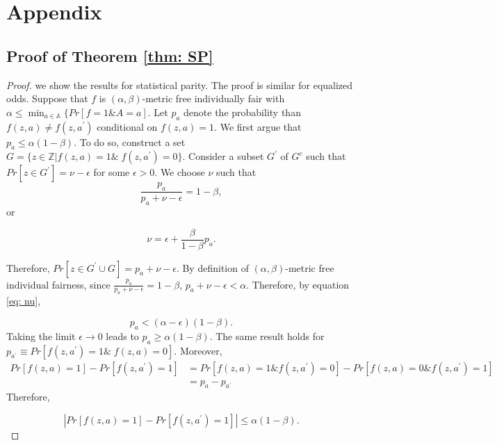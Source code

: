 \documentclass{article}
\begin{document}
\section{Appendix}

\subsection{Proof of Theorem \ref{thm: SP}}
\begin{proof}
we show the results for statistical parity. The proof is similar for equalized odds. Suppose that $f$ is $(\alpha,\beta)$-metric free individually fair with $\alpha \leq \min_{a\in \mathbb{A}}\{Pr[f=1 \& A=a]$. Let $p_{a}$ denote the probability than $f(z, a)\neq f(z, a^{'})$ conditional on  $f(z,a)=1$. We first argue that $p_{a} \leq \alpha(1-\beta)$. To do so, construct a set $G=\{z\in \mathbb{Z}| f(z,a)= 1 \& \; f(z,a^{'})=0\}$. Consider a subset $G^{'}$ of $G^{c}$ such that $Pr[z\in G^{'}]=\nu-\epsilon$ for some $\epsilon>0$. We choose $\nu$ such that $$\frac{p_{a}}{p_{a} + \nu -\epsilon} = 1-\beta, $$
or

\begin{equation}
\label{eq: nu}
\nu = \epsilon + \frac{\beta}{1-\beta}p_{a}.    
\end{equation}

Therefore, $Pr[z\in G^{'}\cup G]=p_{a} + \nu - \epsilon$. By definition of $(\alpha, \beta)$-metric free individual fairness, since $ \frac{p_{a}}{p_{a} + \nu -\epsilon} = 1-\beta$, $p_{a} + \nu -\epsilon < \alpha$. Therefore, by equation \eqref{eq: nu},

$$  p_{a} < (\alpha - \epsilon)(1-\beta).$$ Taking the limit $\epsilon \rightarrow 0$ leads to $p_{a}\geq \alpha(1-\beta)$. The same result holds for $p_{a^{'}}\equiv Pr[f(z, a^{'})=1 \& \; f(z,a)=0]$. Moreover,
\begin{equation}
    \begin{split}
        Pr[f(z, a)=1] - Pr[f(z, a^{'})=1] & =  Pr[f(z, a)=1 \& f(z, a^{'})=0] - Pr[f(z, a)=0 \& f(z, a^{'})=1] \\
         & = p_{a} - p_{a^{'}}
    \end{split}
\end{equation}
Therefore, 

$$|Pr[f(z, a)=1] - Pr[f(z, a^{'})=1]| \leq \alpha(1-\beta). $$
\end{proof}


\end{document}
